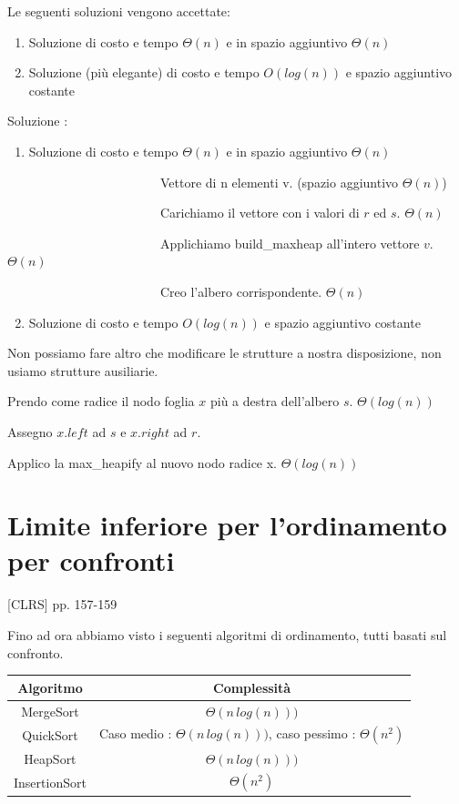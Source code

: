 \documentclass[11pt,a4paper,twoside,openright]{book}
\providecommand{\tightlist}{\setlength{\itemsep}{0pt}\setlength{\parskip}{0pt}}
\begin{document}
{Le seguenti soluzioni vengono accettate:}

\begin{enumerate}
\tightlist
\item
  {Soluzione di costo e tempo $\Theta(n)$ e in spazio aggiuntivo $\Theta(n)$}
\item
  {Soluzione (più elegante) di costo e tempo $O(log(n))$ e spazio aggiuntivo costante}
\end{enumerate}

{Soluzione :}

\begin{enumerate}
\tightlist
\item
  {Soluzione di costo e tempo $\Theta(n)$ e in spazio aggiuntivo $\Theta(n)$}
\end{enumerate}

{~~~~~~~~~~~~~~~~~~~~~~~~Vettore di n elementi v. (spazio aggiuntivo $\Theta(n)$)}

{~~~~~~~~~~~~~~~~~~~~~~~~Carichiamo il vettore con i valori di $r$ ed $s$. $\Theta(n)$}

{~~~~~~~~~~~~~~~~~~~~~~~~Applichiamo build\_maxheap all'intero vettore $v$. $\Theta(n)$}

{~~~~~~~~~~~~~~~~~~~~~~~~Creo l'albero corrispondente. $\Theta(n)$}

\begin{enumerate}
\setcounter{enumi}{1}
\tightlist
\item
  {Soluzione di costo e tempo $O(log(n))$ e spazio aggiuntivo costante}
\end{enumerate}

{Non possiamo fare altro che modificare le strutture a nostra disposizione, non usiamo strutture ausiliarie.}

{Prendo come radice il nodo foglia $x$ più a destra dell'albero $s$. $\Theta(log(n))$}

{Assegno $x.left$ ad $s$ e $x.right$ ad $r$.}

{Applico la max\_heapify al nuovo nodo radice x. $\Theta(log(n))$}


\section{Limite inferiore per l'ordinamento per confronti}

{{[}CLRS{]} pp. 157-159}

{Fino ad ora abbiamo visto i seguenti algoritmi di ordinamento, tutti basati sul confronto.}

\begin{tabular}{|c|c|}
\hline 
Algoritmo & Complessità \\ 
\hline 
MergeSort & $\Theta(n\,log(n)))$ \\ 
\hline 
QuickSort & Caso medio : $\Theta(n\,log(n)))$, caso pessimo : $\Theta(n^2)$ \\ 
\hline 
HeapSort & $\Theta(n\,log(n)))$ \\ 
\hline 
InsertionSort & $\Theta(n^2)$ \\ 
\hline 
\end{tabular} 
\end{document}
